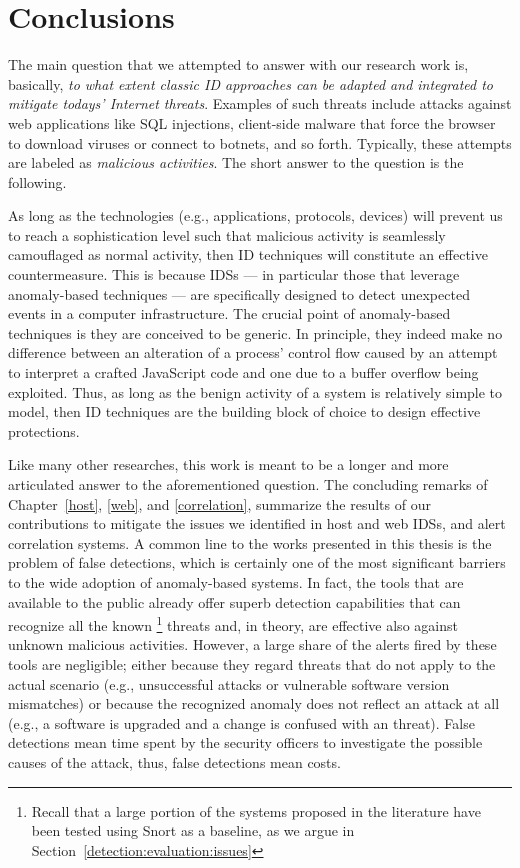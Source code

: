 \chapter{Conclusions}
\label{conclusions}
The main question that we attempted to answer with our research work is, basically, \emph{to what extent classic \ac{ID} approaches can be adapted and integrated to mitigate todays' Internet threats}. Examples of such threats include attacks against web applications like \ac{SQL} injections, client\hyp{}side malware that force the browser to download viruses or connect to botnets, and so forth. Typically, these attempts are labeled as \emph{malicious activities}. The short answer to the question is the following.

As long as the technologies (e.g., applications, protocols, devices) will prevent us to reach a sophistication level such that malicious activity is seamlessly camouflaged as normal activity, then \ac{ID} techniques will constitute an effective countermeasure. This is because \acp{IDS} --- in particular those that leverage anomaly\hyp{}based techniques --- are specifically designed to detect unexpected events in a computer infrastructure. The crucial point of anomaly\hyp{}based techniques is they are conceived to be generic. In principle, they indeed make no difference between an alteration of a process' control flow caused by an attempt to interpret a crafted \textsf{JavaScript} code and one due to a buffer overflow being exploited. Thus, as long as the benign activity of a system is relatively simple to model, then \ac{ID} techniques are the building block of choice to design effective protections.

Like many other researches, this work is meant to be a longer and more articulated answer to the aforementioned question. The concluding remarks of Chapter~\ref{host}, \ref{web}, and \ref{correlation}, summarize the results of our contributions to mitigate the issues we identified in host and web \acp{IDS}, and alert correlation systems. A common line to the works presented in this thesis is the problem of false detections, which is certainly one of the most significant barriers to the wide adoption of anomaly\hyp{}based systems. In fact, the tools that are available to the public already offer superb detection capabilities that can recognize all the known \footnote{Recall that a large portion of the systems proposed in the literature have been tested using \textsf{Snort} as a baseline, as we argue in Section~\ref{detection:evaluation:issues}} threats and, in theory, are effective also against unknown malicious activities. However, a large share of the alerts fired by these tools are negligible; either because they regard threats that do not apply to the actual scenario (e.g., unsuccessful attacks or vulnerable software version mismatches) or because the recognized anomaly does not reflect an attack at all (e.g., a software is upgraded and a change is confused with an threat). False detections mean time spent by the security officers to investigate the possible causes of the attack, thus, false detections mean costs.


